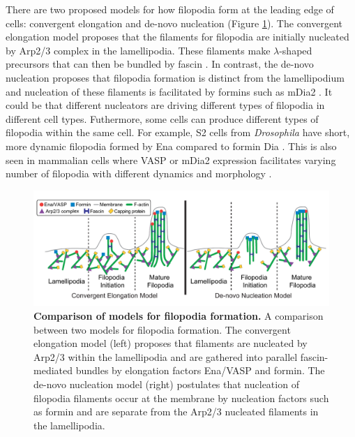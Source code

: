 There are two proposed models for how filopodia form at the leading edge of cells: convergent elongation \citep{yang_filopodia_2011} and de-novo nucleation \citep{faix_filopodia:_2009} (Figure \ref{fig:filopodia-init}). The convergent elongation model proposes that the filaments for filopodia are initially nucleated by Arp2/3 complex in the lamellipodia. These filaments make $\lambda$-shaped precursors that can then be bundled by fascin \citep{svitkina_mechanism_2003,small_lamellipodium:_2002}. In contrast, the de-novo nucleation proposes that filopodia formation is distinct from the lamellipodium and nucleation of these filaments is facilitated by formins such as mDia2 \citep{faix_making_2006,mellor_role_2010}. It could be that different nucleators are driving different types of filopodia in different cell types. Futhermore, some cells can produce different types of filopodia within the same cell. For example, S2 cells from \textit{Drosophila} have short, more dynamic filopodia formed by Ena compared to formin Dia \citep{bilancia_enabled_2014}. This is also seen in mammalian cells where VASP or mDia2 expression facilitates varying number of filopodia with different dynamics and morphology \citep{barzik_ena/vasp_2014}. 

\begin{figure}
\centering
\includegraphics[width=\textwidth]{img/ch01/filopodia_comparison_thesis.pdf}
\caption[Comparison of models for filopodia formation.]{\textbf{Comparison of models for filopodia formation.} A comparison between two models for filopodia formation. The convergent elongation model (left) proposes that filaments are nucleated by Arp2/3 within the lamellipodia and are gathered into parallel fascin-mediated bundles by elongation factors Ena/VASP and formin. The de-novo nucleation model (right) postulates that nucleation of filopodia filaments occur at the membrane by nucleation factors such as formin and are separate from the Arp2/3 nucleated filaments in the lamellipodia.}
\label{fig:filopodia-init}
\end{figure}

